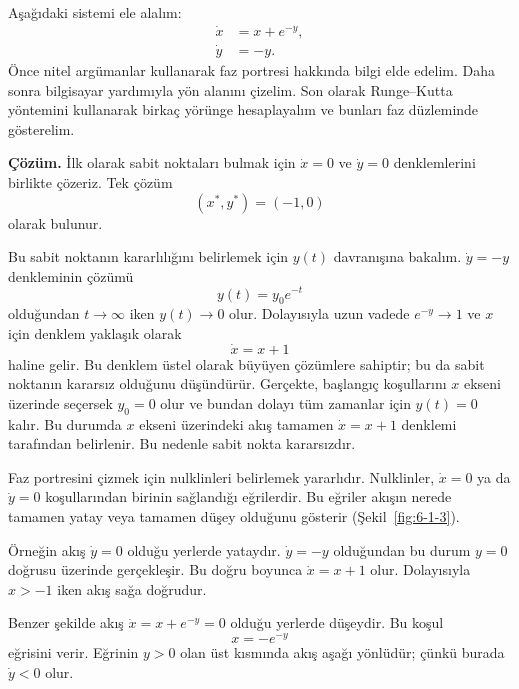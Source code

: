 \begin{justify}
Aşağıdaki sistemi ele alalım:
\begin{align}
\dot{x} &= x+e^{-y},\\
\dot{y} &= -y.
\end{align}
Önce nitel argümanlar kullanarak faz portresi hakkında bilgi elde edelim. Daha sonra bilgisayar yardımıyla yön alanını çizelim. Son olarak Runge--Kutta yöntemini kullanarak birkaç yörünge hesaplayalım ve bunları faz düzleminde gösterelim.

\textbf{Çözüm.} İlk olarak sabit noktaları bulmak için $\dot{x}=0$ ve $\dot{y}=0$ denklemlerini birlikte çözeriz. Tek çözüm
\begin{equation}
(x^{*},y^{*})=(-1,0)
\end{equation}
olarak bulunur.

Bu sabit noktanın kararlılığını belirlemek için $y(t)$ davranışına bakalım. $\dot{y}=-y$ denkleminin çözümü
\begin{equation}
y(t)=y_0e^{-t}
\end{equation}
olduğundan $t\to\infty$ iken $y(t)\to 0$ olur. Dolayısıyla uzun vadede $e^{-y}\to 1$ ve $x$ için denklem yaklaşık olarak
\begin{equation}
\dot{x}=x+1
\end{equation}
haline gelir. Bu denklem üstel olarak büyüyen çözümlere sahiptir; bu da sabit noktanın kararsız olduğunu düşündürür. Gerçekte, başlangıç koşullarını $x$ ekseni üzerinde seçersek $y_0=0$ olur ve bundan dolayı tüm zamanlar için $y(t)=0$ kalır. Bu durumda $x$ ekseni üzerindeki akış tamamen $\dot{x}=x+1$ denklemi tarafından belirlenir. Bu nedenle sabit nokta kararsızdır.

Faz portresini çizmek için nulklinleri belirlemek yararlıdır. Nulklinler, $\dot{x}=0$ ya da $\dot{y}=0$ koşullarından birinin sağlandığı eğrilerdir. Bu eğriler akışın nerede tamamen yatay veya tamamen düşey olduğunu gösterir (Şekil~\ref{fig:6-1-3}).

Örneğin akış $\dot{y}=0$ olduğu yerlerde yataydır. $\dot{y}=-y$ olduğundan bu durum $y=0$ doğrusu üzerinde gerçekleşir. Bu doğru boyunca $\dot{x}=x+1$ olur. Dolayısıyla $x>-1$ iken akış sağa doğrudur.

Benzer şekilde akış $\dot{x}=x+e^{-y}=0$ olduğu yerlerde düşeydir. Bu koşul
\begin{equation}
x=-e^{-y}
\end{equation}
eğrisini verir. Eğrinin $y>0$ olan üst kısmında akış aşağı yönlüdür; çünkü burada $\dot{y}<0$ olur.


\end{justify}
